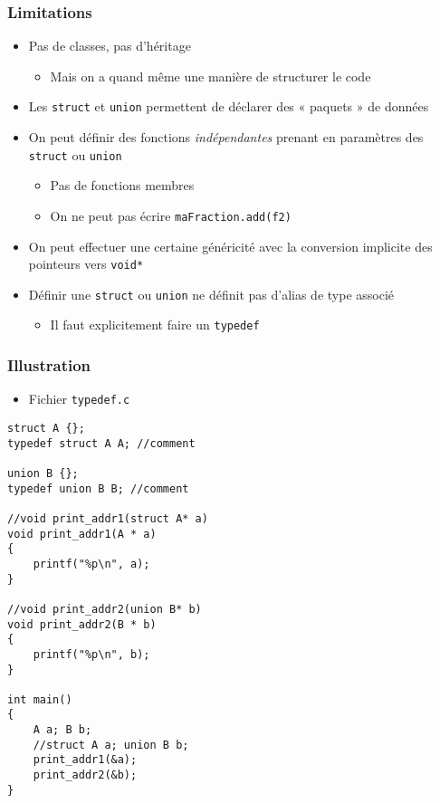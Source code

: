 \begin{frame}
\frametitle{Limitations}
\begin{itemize}[<+->]
\item Pas de classes, pas d'héritage
	\begin{itemize}
	\item Mais on a quand même une manière de structurer le code
	\end{itemize}
\item Les \lstinline|struct| et \lstinline|union| permettent de déclarer des « paquets » de données
\item On peut définir des fonctions \emph{indépendantes} prenant en paramètres des \lstinline|struct| ou \lstinline|union|
	\begin{itemize}
	\item Pas de fonctions membres
	\item On ne peut pas écrire \lstinline|maFraction.add(f2)|
	\end{itemize}
\item On peut effectuer une certaine généricité avec la conversion implicite des pointeurs vers \lstinline|void*|
\item Définir une \lstinline|struct| ou \lstinline|union| ne définit pas d'alias de type associé
	\begin{itemize}
	\item Il faut explicitement faire un \lstinline|typedef|
	\end{itemize}
\end{itemize}
\end{frame}

\begin{frame}[containsverbatim]
\frametitle{Illustration}
\begin{itemize}
\item Fichier \texttt{typedef.c}
\end{itemize}
\begin{lstlisting}
struct A {};
typedef struct A A; //comment

union B {};
typedef union B B; //comment

//void print_addr1(struct A* a)
void print_addr1(A * a)
{
    printf("%p\n", a);
}

//void print_addr2(union B* b)
void print_addr2(B * b)
{
    printf("%p\n", b);
}

int main()
{
    A a; B b;
    //struct A a; union B b;
    print_addr1(&a);
    print_addr2(&b);
}
\end{lstlisting}
\end{frame}

